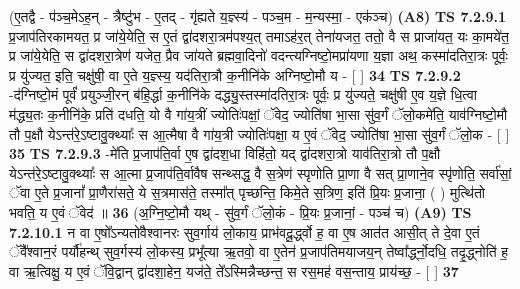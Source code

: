 \documentclass[17pt]{extarticle}
\begin{document}
                  \newline
                      (ए॒तद्वै - प॑ञ्च॒मेऽह॒न् - त्रैष्टु॑भ - ए॒तद् - गृ॑ह्यते य॒ज्ञ्स्य॑ - पञ्च॒म - म॒न्यस्मा॒ - एक॑ञ्च)  \textbf{(A8)} \newline \newline
                                        \textbf{ TS 7.2.9.1} \newline
                  प्र॒जाप॑तिरकामयत॒ प्र जा॑ये॒येति॒ स ए॒तं द्वा॑दशरा॒त्रम॑पश्य॒त् तमाऽह॑र॒त् तेना॑यजत॒ ततो॒ वै स प्राजा॑यत॒ यः का॒मये॑त॒ प्र जा॑ये॒येति॒ स द्वा॑दशरा॒त्रेण॑ यजेत॒ प्रैव जा॑यते ब्रह्मवा॒दिनो॑ वदन्त्यग्निष्टो॒मप्रा॑यणा य॒ज्ञा अथ॒ कस्मा॑दतिरा॒त्रः पूर्वः॒ प्र यु॑ज्यत॒ इति॒ चक्षु॑षी॒ वा ए॒ते य॒ज्ञ्स्य॒ यद॑तिरा॒त्रौ क॒नीनि॑के अग्निष्टो॒मौ य - [  ] \textbf{  34} \newline
                  \newline
                                \textbf{ TS 7.2.9.2} \newline
                  -द॑ग्निष्टो॒मं पूर्वं॑ प्रयुञ्जी॒रन् ब॑हि॒र्द्धा क॒नीनि॑के दद्ध्यु॒स्तस्मा॑दतिरा॒त्रः पूर्वः॒ प्र यु॑ज्यते॒ चक्षु॑षी ए॒व य॒ज्ञे धि॒त्वा म॑द्ध्य॒तः क॒नीनि॑के॒ प्रति॑ दधति॒ यो वै गा॑य॒त्रीं ज्योतिः॑पक्षां॒ ॅवेद॒ ज्योति॑षा भा॒सा सु॑व॒र्गं ॅलो॒कमे॑ति॒ याव॑ग्निष्टो॒मौ तौ प॒क्षौ येऽन्त॑रे॒ऽष्टावु॒क्थ्याः᳚ स आ॒त्मैषा वै गा॑य॒त्री ज्योतिः॑पक्षा॒ य ए॒वं ॅवेद॒ ज्योति॑षा भा॒सा सु॑व॒र्गं ॅलो॒क - [  ] \textbf{  35} \newline
                  \newline
                                \textbf{ TS 7.2.9.3} \newline
                  -मे॑ति प्र॒जाप॑ति॒र्वा ए॒ष द्वा॑दश॒धा विहि॑तो॒ यद् द्वा॑दशरा॒त्रो याव॑तिरा॒त्रो तौ प॒क्षौ येऽन्त॑रे॒ऽष्टावु॒क्थ्याः᳚ स आ॒त्मा प्र॒जाप॑ति॒र्वावैष सन्थ्सद्ध॒ वै स॒त्रेण॑ स्पृणोति प्रा॒णा वै सत् प्रा॒णाने॒व स्पृ॑णोति॒ सर्वा॑सां॒ ॅवा ए॒ते प्र॒जानां᳚ प्रा॒णैरा॑सते॒ ये स॒त्रमास॑ते॒ तस्मा᳚त् पृच्छन्ति॒ किमे॒ते स॒त्रिण॒ इति॑ प्रि॒यः प्र॒जाना॒ ( ) मुत्थि॑तो भवति॒ य ए॒वं ॅवेद॑ ॥ \textbf{  36} \newline
                  \newline
                      (अ॒ग्नि॒ष्टो॒मौ यथ् - सु॑व॒र्गं ॅलो॒कं - प्रि॒यः प्र॒जानां॒ - पञ्च॑ च)  \textbf{(A9)} \newline \newline
                                        \textbf{ TS 7.2.10.1} \newline
                  न वा ए॒षो᳚ऽन्यतो॑वैश्वानरः सुव॒र्गाय॑ लो॒काय॒ प्राभ॑वदू॒र्द्ध्वो ह॒ वा ए॒ष आत॑त आसी॒त् ते दे॒वा ए॒तं ॅवै᳚श्वान॒रं पर्यौ॑हन्थ् सुव॒र्गस्य॑ लो॒कस्य॒ प्रभू᳚त्या ऋ॒तवो॒ वा ए॒तेन॑ प्र॒जाप॑तिमयाजय॒न् तेष्वा᳚र्द्ध्नो॒दधि॒ तदृ॒द्ध्नोति॑ ह॒ वा ऋ॒त्विक्षु॒ य ए॒वं ॅवि॒द्वान् द्वा॑दशा॒हेन॒ यज॑ते॒ ते᳚ऽस्मिन्नैच्छन्त॒ स रस॒मह॑ वस॒न्ताय॒ प्राय॑च्छ॒ - [  ] \textbf{  37} \newline
\end{document}
